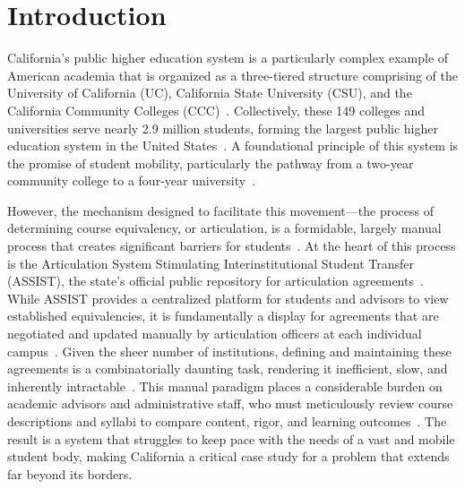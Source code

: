 \chapter{Introduction}

California's public higher education system is a particularly complex example of American academia that is organized as a three-tiered structure comprising of the University of California (UC), California State University (CSU), and the California Community Colleges (CCC)~\cite{ppic}. Collectively, these 149 colleges and universities serve nearly 2.9 million students, forming the largest public higher education system in the United States~\cite{ppic,uc,calstate,cccco}. A foundational principle of this system is the promise of student mobility, particularly the pathway from a two-year community college to a four-year university~\cite{ppic}.

However, the mechanism designed to facilitate this movement—the process of determining course equivalency, or articulation, is a formidable, largely manual process that creates significant barriers for students~\cite{pardos10.1145/3330430.3333622}. At the heart of this process is the Articulation System Stimulating Interinstitutional Student Transfer (ASSIST), the state's official public repository for articulation agreements~\cite{assistinfo}. While ASSIST provides a centralized platform for students and advisors to view established equivalencies, it is fundamentally a display for agreements that are negotiated and updated manually by articulation officers at each individual campus~\cite{assistfaq}. Given the sheer number of institutions, defining and maintaining these agreements is a combinatorially daunting task, rendering it inefficient, slow, and inherently intractable~\cite{pardos10.1145/3330430.3333622}. This manual paradigm places a considerable burden on academic advisors and administrative staff, who must meticulously review course descriptions and syllabi to compare content, rigor, and learning outcomes~\cite{pardos10.1145/3330430.3333622}. The result is a system that struggles to keep pace with the needs of a vast and mobile student body, making California a critical case study for a problem that extends far beyond its borders.

